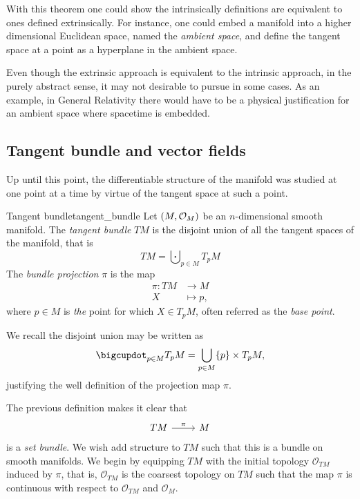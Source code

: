 With this theorem one could show the intrinsically definitions are equivalent to ones defined extrinsically. For instance, one could embed a manifold into a higher dimensional Euclidean space, named the \emph{ambient space}, and define the tangent space at a point as a hyperplane in the ambient space.

Even though the extrinsic approach is equivalent to the intrinsic approach, in the purely abstract sense, it may not desirable to pursue in some cases. As an example, in General Relativity there would have to be a physical justification for an ambient space where spacetime is embedded.

\subsection{Tangent bundle and vector fields}
Up until this point, the differentiable structure of the manifold was studied at one point at a time by virtue of the tangent space at such a point.

\begin{definition}{Tangent bundle}{tangent_bundle}
    Let \(\left(M, \mathcal{O}_{M}\right)\) be an \(n\)-dimensional smooth manifold. The \emph{tangent bundle }\(TM\) is the disjoint union of all the tangent spaces of the manifold, that is
    \begin{equation*}
        TM = \bigcupdot_{p \in M} T_pM
    \end{equation*}
    The \emph{bundle projection} \(\pi\) is the map
    \begin{align*}
        \pi : TM &\to M\\
               X &\mapsto p,
    \end{align*}
    where \(p \in M\) is \emph{the} point for which \(X \in T_pM\), often referred as the \emph{base point}.
\end{definition}
\begin{remark}
    We recall the disjoint union may be written as
    \begin{equation*}
        \bigcupdot_{p\in M} T_pM = \bigcup_{p \in M} \set*{p} \times T_pM,
    \end{equation*}
    justifying the well definition of the projection map \(\pi\).
\end{remark}

The previous definition makes it clear that
\begin{equation*}
    \begin{tikzcd}[column sep = normal, row sep = large]
        TM \arrow{r}{\pi} & M
    \end{tikzcd}
\end{equation*}
is a \emph{set bundle}. We wish add structure to \(TM\) such that this is a bundle on smooth manifolds. We begin by equipping \(TM\) with the initial topology \(\mathcal{O}_{TM}\) induced by \(\pi\), that is,  \(\mathcal{O}_{TM}\) is the coarsest topology on \(TM\) such that the map \(\pi\) is continuous with respect to \(\mathcal{O}_{TM}\) and \(\mathcal{O}_M\).

